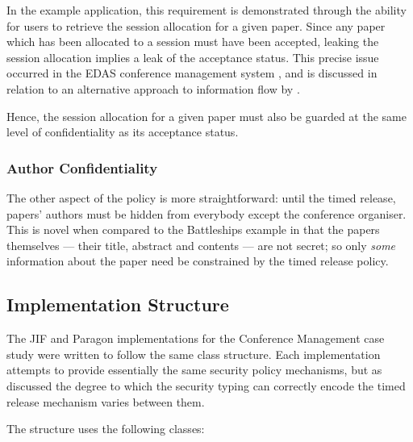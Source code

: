 In the example application, this requirement is demonstrated through the ability for users to retrieve the session allocation for a given paper. Since any paper which has been allocated to a session must have been accepted, leaking the session allocation implies a leak of the acceptance status. This precise issue occurred in the EDAS conference management system \cite{agrawal2016edas_conf}, and is discussed in relation to an alternative approach to information flow by \citeauthor{polikarpova2016lifty} \cite{polikarpova2016lifty}.

Hence, the session allocation for a given paper must also be guarded at the same level of confidentiality as its acceptance status.

\subsubsection{Author Confidentiality}

The other aspect of the policy is more straightforward: until the timed release, papers' authors must be hidden from everybody except the conference organiser. This is novel when compared to the Battleships example in that the papers themselves --- their title, abstract and contents --- are not secret; so only \textit{some} information about the paper need be constrained by the timed release policy.

\newpage

\subsection{Implementation Structure}

The JIF and Paragon implementations for the Conference Management case study were written to follow the same class structure. Each implementation attempts to provide essentially the same security policy mechanisms, but as discussed the degree to which the security typing can correctly encode the timed release mechanism varies between them.

The structure uses the following classes:

